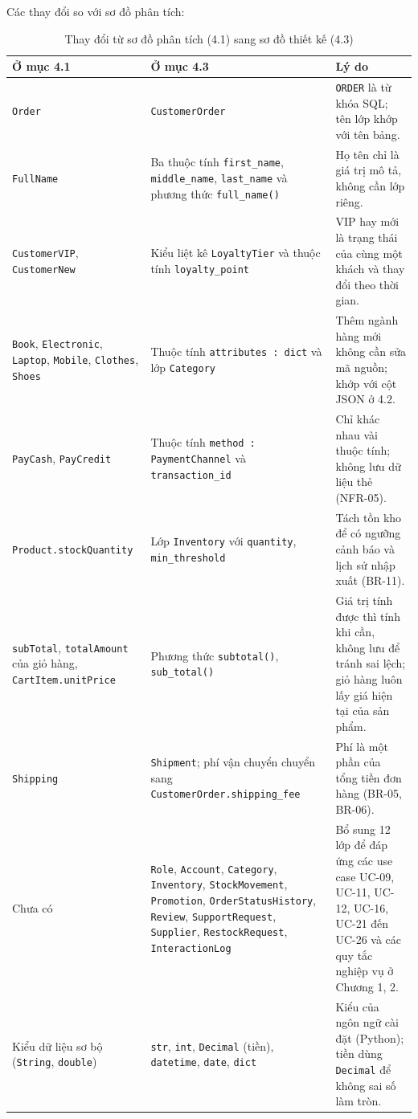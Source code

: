 \documentclass[12pt,a4paper,oneside]{report}
\begin{document}
Các thay đổi so với sơ đồ phân tích:

\begin{longtable}{p{4.2cm}p{4.6cm}p{6.6cm}}
\caption{Thay đổi từ sơ đồ phân tích (4.1) sang sơ đồ thiết kế (4.3)}\\
\toprule
\textbf{Ở mục 4.1} & \textbf{Ở mục 4.3} & \textbf{Lý do} \\
\midrule
\endhead
\bottomrule
\endlastfoot
\texttt{Order} & \texttt{CustomerOrder} & \texttt{ORDER} là từ khóa SQL; tên lớp khớp với tên bảng. \\
\texttt{FullName} & Ba thuộc tính \texttt{first\_name}, \texttt{middle\_name}, \texttt{last\_name} và phương thức \texttt{full\_name()} & Họ tên chỉ là giá trị mô tả, không cần lớp riêng. \\
\texttt{CustomerVIP}, \texttt{CustomerNew} & Kiểu liệt kê \texttt{LoyaltyTier} và thuộc tính \texttt{loyalty\_point} & VIP hay mới là trạng thái của cùng một khách và thay đổi theo thời gian. \\
\texttt{Book}, \texttt{Electronic}, \texttt{Laptop}, \texttt{Mobile}, \texttt{Clothes}, \texttt{Shoes} & Thuộc tính \texttt{attributes : dict} và lớp \texttt{Category} & Thêm ngành hàng mới không cần sửa mã nguồn; khớp với cột JSON ở 4.2. \\
\texttt{PayCash}, \texttt{PayCredit} & Thuộc tính \texttt{method : PaymentChannel} và \texttt{transaction\_id} & Chỉ khác nhau vài thuộc tính; không lưu dữ liệu thẻ (NFR-05). \\
\texttt{Product.stockQuantity} & Lớp \texttt{Inventory} với \texttt{quantity}, \texttt{min\_threshold} & Tách tồn kho để có ngưỡng cảnh báo và lịch sử nhập xuất (BR-11). \\
\texttt{subTotal}, \texttt{totalAmount} của giỏ hàng, \texttt{CartItem.unitPrice} & Phương thức \texttt{subtotal()}, \texttt{sub\_total()} & Giá trị tính được thì tính khi cần, không lưu để tránh sai lệch; giỏ hàng luôn lấy giá hiện tại của sản phẩm. \\
\texttt{Shipping} & \texttt{Shipment}; phí vận chuyển chuyển sang \texttt{CustomerOrder.shipping\_fee} & Phí là một phần của tổng tiền đơn hàng (BR-05, BR-06). \\
Chưa có & \texttt{Role}, \texttt{Account}, \texttt{Category}, \texttt{Inventory}, \texttt{StockMovement}, \texttt{Promotion}, \texttt{OrderStatusHistory}, \texttt{Review}, \texttt{SupportRequest}, \texttt{Supplier}, \texttt{RestockRequest}, \texttt{InteractionLog} & Bổ sung 12 lớp để đáp ứng các use case UC-09, UC-11, UC-12, UC-16, UC-21 đến UC-26 và các quy tắc nghiệp vụ ở Chương 1, 2. \\
Kiểu dữ liệu sơ bộ (\texttt{String}, \texttt{double}) & \texttt{str}, \texttt{int}, \texttt{Decimal} (tiền), \texttt{datetime}, \texttt{date}, \texttt{dict} & Kiểu của ngôn ngữ cài đặt (Python); tiền dùng \texttt{Decimal} để không sai số làm tròn. \\
\end{longtable}
\end{document}
